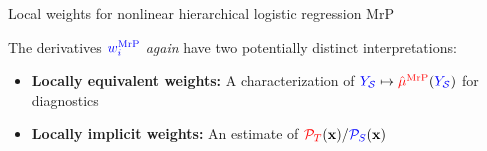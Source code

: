 \begin{frame}[t]{Local weights for nonlinear hierarchical logistic regression MrP}
{\vspace{0.5em}
The derivatives $\textcolor{blue}{w_i^{\mathrm{MrP}}}$ \emph{again} have two potentially distinct interpretations:
%
\begin{itemize}
\item \textbf{Locally equivalent weights: }A characterization of $\textcolor{blue}{Y_{\mathcal{S}}} \mapsto \textcolor{red}{\hat{\mu}^{\mathrm{MrP}}}(\textcolor{blue}{\textcolor{blue}{Y_{\mathcal{S}}}})$ for diagnostics
\item \textbf{Locally implicit weights: }An estimate of $\textcolor{red}{\mathcal{P}_{T}}(\mathbf{x}) / \textcolor{blue}{{\mathcal{P}_{S}}}(\mathbf{x})$
\end{itemize}
%
%
%
}


\end{frame}





